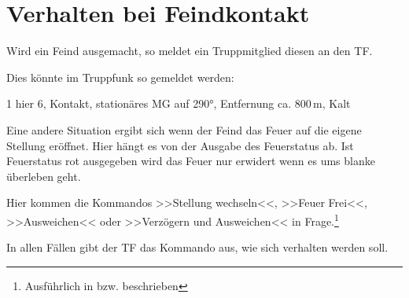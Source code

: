\pagebreak
\section{Verhalten bei Feindkontakt}
	Wird ein Feind ausgemacht, so meldet ein Truppmitglied diesen an den TF.
	\par\medskip
	Dies könnte im Truppfunk so gemeldet werden:
	\begin{hint}
		1 hier 6, Kontakt, stationäres MG auf 290°, Entfernung ca. 800\,m, Kalt
	\end{hint}
	Eine andere Situation ergibt sich wenn der Feind das Feuer auf die eigene Stellung eröffnet. Hier hängt es von der Ausgabe des Feuerstatus ab. Ist Feuerstatus rot ausgegeben wird das Feuer nur erwidert wenn es ums blanke überleben geht.
	\par\medskip
	Hier kommen die Kommandos >>Stellung wechseln<<, >>Feuer Frei<<, >>Ausweichen<< oder >>Verzögern und Ausweichen<< in Frage.\footnote{Ausführlich in  bzw.  beschrieben}
	\par\medskip
	In allen Fällen gibt der TF das Kommando aus, wie sich verhalten werden soll.
